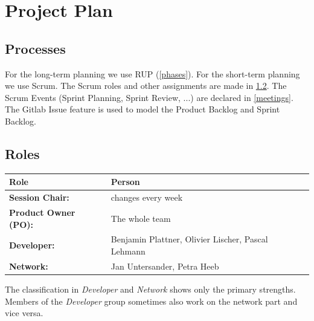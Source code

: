 \chapter{Project Plan}


\section{Processes}
For the long-term planning we use RUP (\ref{phases}).
For the short-term planning we use Scrum.
The Scrum roles and other assignments are made in \ref{roles}.
The Scrum Events (Sprint Planning, Sprint Review, ...) are declared in \ref{meetings}.
The Gitlab Issue feature is used to model the Product Backlog and Sprint Backlog.

\section{Roles}
\label{roles}

\begin{tabular}{|l|l|}
    \textbf{Role} & \textbf{Person}\\
    \hline
    \textbf{Session Chair:} & changes every week \\
    \textbf{Product Owner (PO):} & The whole team \\
    \textbf{Developer:} & Benjamin Plattner, Olivier Lischer, Pascal Lehmann\\
    \textbf{Network:} & Jan Untersander, Petra Heeb \\
\end{tabular}
\newline
\noindent The classification in \textsl{Developer} and \textsl{Network} shows only the primary strengths.
Members of the \textsl{Developer} group sometimes also work on the network part and vice versa.


